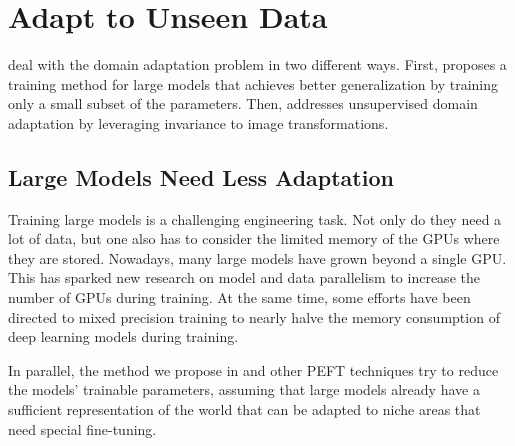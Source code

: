 
\section{Adapt to Unseen Data}\label{sec:disc_adapt}
 deal with the domain adaptation problem in two different ways. First,  proposes a training method for large models that achieves better generalization by training only a small subset of the parameters. Then,  addresses unsupervised domain adaptation by leveraging invariance to image transformations.

\subsection{Large Models Need Less Adaptation}
Training large models is a challenging engineering task. Not only do they need a lot of data, but one also has to consider the limited memory of the GPUs where they are stored. Nowadays, many large models have grown beyond a single GPU. This has sparked new research on model and data parallelism to increase the number of GPUs during training. At the same time, some efforts have been directed to mixed precision training to nearly halve the memory consumption of deep learning models during training.

In parallel, the method we propose in  and other PEFT techniques try to reduce the models' trainable parameters, assuming that large models already have a sufficient representation of the world that can be adapted to niche areas that need special fine-tuning. 